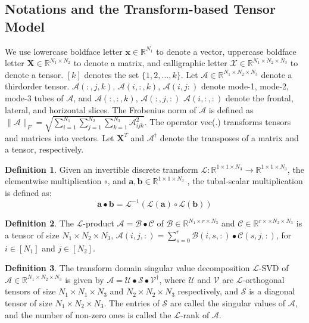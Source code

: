 \documentclass[journal,article,submit,moreauthors,pdftex,10pt,a4paper]{Definitions/mdpi}
\theoremstyle{plain}
\theoremstyle{definition}
\newtheorem{defn}{Definition}[section]
\theoremstyle{remark}
\begin{document}
\subsection{Notations and the Transform-based Tensor Model}
We use lowercase boldface letter $\mathbf{x} \in \mathbb{R}^{N_1}$ to denote a vector, uppercase boldface letter $\mathbf{X} \in \mathbb{R}^{N_1 \times N_2}$ to denote a matrix, 
and calligraphic letter $\mathcal{X} \in \mathbb{R}^{N_1 \times N_2 \times N_3}$ to denote a tensor. $[k]$ denotes the set $\{1,2,\dots, k\}$. Let $\mathcal{A} \in \mathbb{R}^{N_1 \times N_2 \times N_3}$ 
denote a thirdorder tensor. $\mathcal{A}(:,j,k)$, $\mathcal{A}(i,:,k)$, $\mathcal{A}(i,j:)$ denote mode-1, mode-2, mode-3 tubes of $\mathcal{A}$, and $\mathcal{A}(:,:,k)$, $\mathcal{A}(:,j,:)$ $\mathcal{A}(i,:,:)$ 
denote the frontal, lateral, and horizontal slices. The Frobenius norm of $\mathcal{A}$ is defined as $\|\mathcal{A}\|_F = \sqrt{\sum ^{N_1}_{i = 1} \sum ^{N_2}_{j = 1} \sum ^{N_3}_{k = 1} \mathcal{A}^2_{ijk}}$.
The operator vec(.) transforms tensors and matrices into vectors. Let $\mathbf{X}^{T}$ and $\mathcal{A}^{\dagger}$ denote the transposes of a matrix and a tensor, respectively.
\begin{defn}\cite{liu2017fourth}
    Given an invertible discrete transform $\mathcal{L}:\mathbb{R}^{1\times 1 \times N_3} \to \mathbb{R}^{1\times 1\times N_3}$, the elementwise multiplication $\circ$, and $\mathbf{a}, \mathbf{b} \in \mathbb{R}^{1\times 1\times N_3}$ , the tubal-scalar multiplication is defined as:
        \begin{equation}
            \mathbf{a} \bullet \mathbf{b} = \mathcal{L}^{-1}(\mathcal{L}(\mathbf{a})\circ \mathcal{L}(\mathbf{b}))
        \end{equation}
\end{defn}

\begin{defn}\cite{liu2017fourth}
    The $\mathcal{L}$-product $\mathcal{A} = \mathcal{B} \bullet \mathcal{C}$ of $\mathcal{B} \in \mathbb{R}^{N_1 \times r \times N_3}$ and $\mathcal{C} \in \mathbb{R}^{r\times \times N_2 \times N_3}$ is a tensor of size $N_1 \times N_2 \times N_3$, $\mathcal{A}(i,j,:) = \sum^r_{s=0}\mathcal{B}(i,s,:)\bullet \mathcal{C}(s,j,:)$, for $i \in [N_1]$ and $j \in [N_2]$.
\end{defn}

\begin{defn}\cite{liu2017fourth}
    The transform domain singular value decomposition $\mathcal{L}$-SVD of $\mathcal{A} \in \mathbb{R}^{N_1 \times N_2 \times N_3}$ is given by $\mathcal{A} = \mathcal{U} \bullet \mathcal{S} \bullet \mathcal{V}^{\dagger}$, where $\mathcal{U}$ and $\mathcal{V}$ are $\mathcal{L}$-orthogonal tensors of size $N_1 \times N_1 \times N_3$ and $N_2 \times N_2 \times N_3$ respectively, and $\mathcal{S}$ is a diagonal tensor of size $N_1 \times N_2 \times N_3$. The entries of $\mathcal{S}$ are called the singular values of $\mathcal{A}$, and the number of non-zero ones is called the $\mathcal{L}$-rank of $\mathcal{A}$.
\end{defn}
\end{document}
